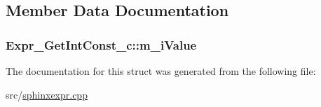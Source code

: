 \subsection{Member Data Documentation}
\hypertarget{structExpr__GetIntConst__c_a9bba3cc0bb15ac4513ee3b7db34525ca}{
\subsubsection[{m\-\_\-i\-Value}]{ Expr\-\_\-\-Get\-Int\-Const\-\_\-c\-::m\-\_\-i\-Value}}\label{structExpr__GetIntConst__c_a9bba3cc0bb15ac4513ee3b7db34525ca}


The documentation for this struct was generated from the following file\-:\begin{DoxyCompactItemize}
\item 
src/\hyperlink{sphinxexpr_8cpp}{sphinxexpr.\-cpp}\end{DoxyCompactItemize}
